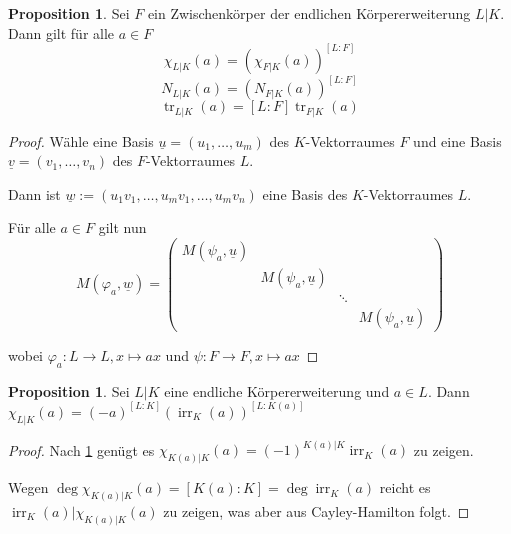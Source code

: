 \documentclass[
twoside=semi,
fontsize=12,
DIV=12, 
cleardoublepage=current,
leqno,
headings=optiontoheadandtoc, 
toc=idx
]{scrbook}
\DeclareMathOperator{\irr}{irr}
\DeclareMathOperator{\tr}{tr}
\theoremstyle{definition}
\newtheorem{proposition}[definition]{Proposition}
\begin{document}
	\begin{proposition}\label{2.4.4}
		Sei $F$ ein Zwischenk\"orper der endlichen K\"orpererweiterung $L|K$. Dann gilt f\"ur alle $a \in F$
			\[\chi_{L|K}(a) = (\chi_{F|K}(a))^{[L:F]}\]
			\[N_{L|K}(a) = (N_{F|K}(a))^{[L:F]}\]
			\[\tr_{L|K}(a) = [L:F]\tr_{F|K}(a)\]
			
		\begin{proof}
			W\"ahle eine Basis $\underline{u} = (u_1, \dots, u_m)$ des $K$-Vektorraumes $F$ und eine Basis $\underline{v} = (v_1, \dots, v_n)$ des $F$-Vektorraumes $L$.
			
			Dann ist $\underline{w} := (u_1v_1, \dots, u_mv_1, \dots, u_mv_n)$ eine Basis des $K$-Vektorraumes $L$.
			
			F\"ur alle $a \in F$ gilt nun
				\[M(\varphi_{a}, \underline{w}) = \begin{pmatrix}
					M(\psi_a, \underline{u}) & & & \\
					& M(\psi_a, \underline{u}) & & \\
					& & \ddots & \\
					& & & M(\psi_a, \underline{u})
				\end{pmatrix}\]
			
			wobei $\varphi_a: L \to L, x \mapsto ax$ und $\psi: F \to F, x \mapsto ax$
		\end{proof}
	\end{proposition}
	
	\begin{proposition}\label{2.4.5}
		Sei $L|K$ eine endliche K\"orpererweiterung und $a \in L$. Dann $\chi_{L|K}(a) = (-a)^{[L:K]}(\irr_K(a))^{[L:K(a)]}$
		
		\begin{proof}
			Nach \ref{2.4.4} gen\"ugt es $\chi_{K(a)|K}(a) = (-1)^{K(a)|K} \irr_K(a)$ zu zeigen.
			
			Wegen $\deg \chi_{K(a)|K}(a) = [K(a):K] = \deg \irr_K(a)$ reicht es $\irr_K(a)|\chi_{K(a)|K}(a)$ zu zeigen, was aber aus Cayley-Hamilton folgt.
		\end{proof}
	\end{proposition}
	
\end{document}
